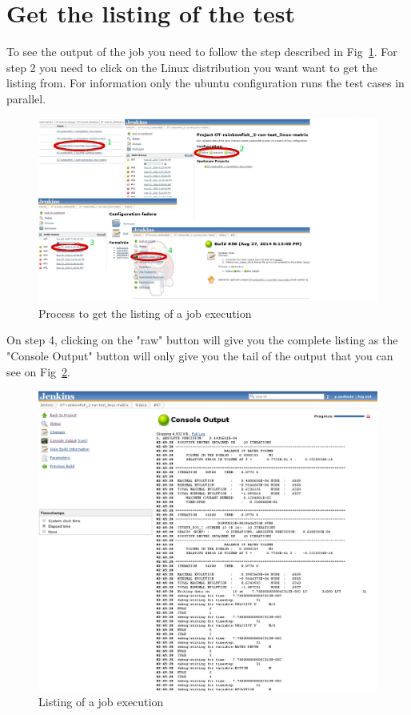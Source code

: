 \section{Get the listing of the test}
%
%
To see the output of the job you need to follow the step described in
Fig~\ref{fig:cis-to-listing}. For step 2 you need to click on the Linux
distribution you want want to get the listing from.  For information only the
ubuntu configuration runs the test cases in parallel.
%
\begin{figure}[H]
    \centering
    \includegraphics[scale=0.3]{graphics/cis-to-listing.jpg}
    \caption{Process to get the listing of a job execution}
    \label{fig:cis-to-listing}
\end{figure}
%
On step 4, clicking on the "raw" button will give you the complete listing as
the "Console Output" button will only give you the tail of the output that you
can see on Fig~\ref{fig:cis-listing}.
%
\begin{figure}[H]
    \centering
    \includegraphics[scale=0.35]{graphics/cis-listing.png}
    \caption{Listing of a job execution}
    \label{fig:cis-listing}
\end{figure}
%
